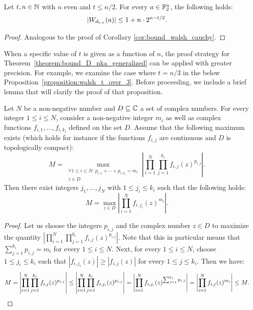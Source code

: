 \documentclass[11pt]{llncs}
\begin{document}
\begin{Corollary}\label{cor:gen}
    Let $t, n\in \mathbb{N}$ with $n$ even and $t\le n/2$. For every $a\in\mathbb{F}_2^n$, the following holds:
    \[
        |W_{d_{t,n}}(a)|\leq 1+n\cdot 2^{n-t/2}.
    \]
\end{Corollary}

\begin{proof}
    Analogous to the proof of Corollary \ref{cor:bound_walsh_cauchy}.
\end{proof}


When a specific value of $t$ is given as a function of $n$, the proof strategy for Theorem~\ref{theorem:bound_D_nka_generalized} can be applied with greater precision. For example, we examine the case where $t=n/3$ in the below Proposition~\ref{proposition:walsh_t_over_3}. Before proceeding, we include a brief lemma that will clarify the proof of that proposition.

\begin{lemma}\label{lemma:maximizing_args}
    Let $N$ be a non-negative number and $D\subseteq\mathbb{C}$ a set of complex numbers. For every integer $1\leq i\leq N$, consider a non-negative integer $m_i$ as well as complex functions $f_{i,1},\dots,f_{i,k_i}$ defined on the set $D$. Assume that the following maximum exists (which holds for instance if the functions $f_{i,j}$ are continuous and $D$ is topologically compact):
    \[
        M=\max_{\substack{\forall 1\leq i\leq N:\,p_{i,1}+\cdots+p_{i,k_i}=m_i\\z\in D}}\left|\prod_{i=1}^N\prod_{j=1}^{k_i}f_{i,j}(z)^{p_{i,j}}\right|.
    \]
    Then there exist integers $j_1,\dots,j_N$ with $1\leq j_i\leq k_i$ such that the following holds:
    \[
        M=\max_{z\in D}\left|\prod_{i=1}^Nf_{i,j_i}(z)^{m_i}\right|.
    \]
\end{lemma}

\begin{proof}
    Let us choose the integers $p_{i,j}$ and the complex number $z\in D$ to maximize the quantity $\left|\prod_{i=1}^N\prod_{j=1}^{k_i}f_{i,j}(z)^{p_{i,j}}\right|$. Note that this in particular means that $\sum_{j=1}^{k_i}p_{i,j}=m_i$ for every $1\leq i\leq N$. Next, for every $1\leq i\leq N$, choose $1\leq j_i\leq k_i$ such that $|f_{i,j_i}(z)|\geq|f_{i,j}(z)|$ for every $1\leq j\leq k_i$. Then we have:
    \[
        M=\left|\prod_{i=1}^N\prod_{j=1}^{k_i}f_{i,j}(z)^{p_{i,j}}\right|\leq\left|\prod_{i=1}^N\prod_{j=1}^{k_i}f_{i,j_i}(z)^{p_{i,j}}\right|=\left|\prod_{i=1}^Nf_{i,j_i}(z)^{\sum_{j=1}^{k_i}p_{i,j}}\right|=\left|\prod_{i=1}^Nf_{i,j}(z)^{m_i}\right|\leq M.\qedhere
    \]
\end{proof}
\end{document}
